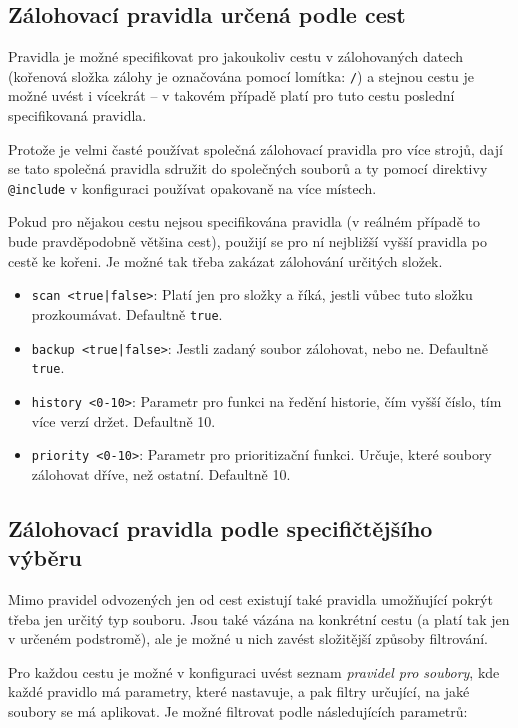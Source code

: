 \subsection{Zálohovací pravidla určená podle cest}

Pravidla je možné specifikovat pro jakoukoliv cestu v zálohovaných datech
(kořenová složka zálohy je označována pomocí lomítka: \texttt{/}) a stejnou
cestu je možné uvést i vícekrát -- v takovém případě platí pro tuto cestu
poslední specifikovaná pravidla.

Protože je velmi časté používat společná zálohovací pravidla pro více strojů,
dají se tato společná pravidla sdružit do společných souborů a ty pomocí
direktivy \texttt{@include} v konfiguraci používat opakovaně na více místech.

Pokud pro nějakou cestu nejsou specifikována pravidla (v reálném případě to bude
pravděpodobně většina cest), použijí se pro ní nejbližší vyšší pravidla po cestě
ke kořeni. Je možné tak třeba zakázat zálohování určitých složek.

\medskip

\begin{itemize}
	\item {\tt scan <true|false>}: Platí jen pro složky a říká, jestli vůbec
	tuto složku prozkoumávat. Defaultně {\tt true}.
	\item {\tt backup <true|false>}: Jestli zadaný soubor zálohovat, nebo
	ne. Defaultně {\tt true}.
	\item {\tt history <0-10>}: Parametr pro funkci na ředění historie, čím
	vyšší číslo, tím více verzí držet. Defaultně 10.
	\item {\tt priority <0-10>}: Parametr pro prioritizační funkci. Určuje,
	které soubory zálohovat dříve, než ostatní. Defaultně 10.
\end{itemize}

\subsection{Zálohovací pravidla podle specifičtějšího výběru}

Mimo pravidel odvozených jen od cest existují také pravidla umožňující pokrýt
třeba jen určitý typ souboru. Jsou také vázána na konkrétní cestu (a platí tak
jen v určeném podstromě), ale je možné u nich zavést složitější způsoby
filtrování.

Pro každou cestu je možné v konfiguraci uvést seznam {\it pravidel pro soubory},
kde každé pravidlo má parametry, které nastavuje, a pak filtry určující, na jaké
soubory se má aplikovat. Je možné filtrovat podle následujících parametrů:

